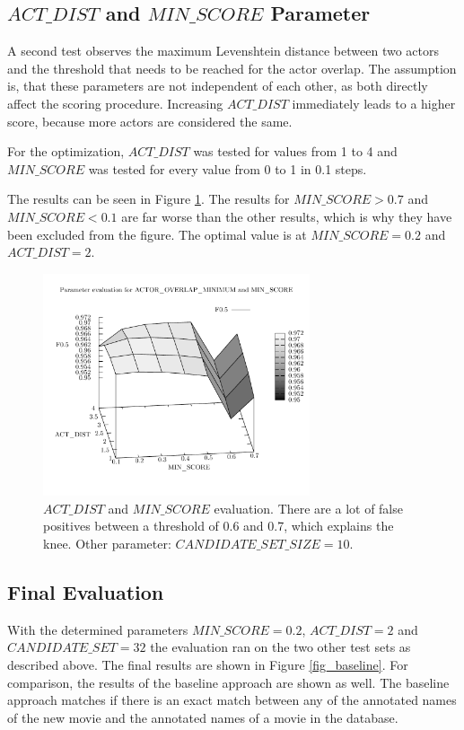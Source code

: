 \subsection{$ACT\_DIST$ and $MIN\_SCORE$ Parameter}
A second test observes the maximum Levenshtein distance between two actors and the threshold that needs to be reached for the actor overlap.
The assumption is, that these parameters are not independent of each other, as both directly affect the scoring procedure.
Increasing $ACT\_DIST$ immediately leads to a higher score, because more actors are considered the same.

For the optimization, $ACT\_DIST$ was tested for values from 1 to 4 and $MIN\_SCORE$ was tested for every value from 0 to 1 in 0.1 steps.

The results can be seen in Figure \ref{fig_3d}.
The results for $MIN\_SCORE > 0.7$ and $MIN\_SCORE < 0.1$ are far worse than the other results, which is why they have been excluded from the figure.
The optimal value is at $MIN\_SCORE = 0.2$ and $ACT\_DIST = 2$.

\begin{figure}[h!]
  \begin{center}
  \includegraphics[width=0.7\textwidth]{images/3d.pdf}
  \end{center}
  \caption{$ACT\_DIST$  and $MIN\_SCORE$ evaluation. There are a lot of false positives between a threshold of 0.6 and 0.7, which explains the knee. Other parameter: $CANDIDATE\_SET\_SIZE = 10$.}
  \label{fig_3d}
\end{figure}

\subsection{Final Evaluation}
With the determined parameters $MIN\_SCORE = 0.2$, $ACT\_DIST = 2$ and $CANDIDATE\_SET = 32$ the evaluation ran on the two other test sets as described above.
The final results are shown in Figure \ref{fig_baseline}.
For comparison, the results of the baseline approach are shown as well.
The baseline approach matches if there is an exact match between any of the annotated names of the new movie and the annotated names of a movie in the database.

